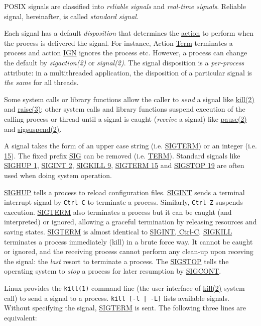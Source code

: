POSIX signals are classified into \textit{reliable signals} and
\textit{real-time signals}. Reliable signal, hereinafter, is
called \textit{standard signal}.

Each signal has a default \textit{disposition} that determines the
\uline{action} to perform when the process is delivered the
signal. For instance, Action \uline{Term} terminates a process and
action \uline{IGN} ignores the process etc. However, a process can
change the default by \textit{sigaction(2)} or
\textit{signal(2)}. The signal disposition is a
\textit{per-process} attribute: in a multithreaded application,
the disposition of a particular signal is \textit{the same} for
all threads.

Some system calls or library functions allow the caller to
\textit{send} a signal like \uline{kill(2)} and \uline{raise(3)};
other system calls and library functions suspend execution of the
calling process or thread until a signal is caught
(\textit{receive} a signal) like \uline{pause(2)} and
\uline{sigsuspend(2)}.

A signal takes the form of an upper case string
(i.e. \uline{SIGTERM}) or an integer (i.e. \uline{15}). The fixed
prefix \uline{SIG} can be removed (i.e. \uline{TERM}). Standard
signals like \uline{SIGHUP 1}, \uline{SIGINT 2}, \uline{SIGKILL
  9}, \uline{SIGTERM 15} and \uline{SIGSTOP 19} are often used
when doing system operation.

\uline{SIGHUP} tells a process to reload configuration
files. \uline{SIGINT} sends a terminal interrupt signal by
\verb|Ctrl-C| to terminate a process. Similarly, \verb|Ctrl-Z|
suspends execution. \uline{SIGTERM} also terminates a process but
it can be caught (and interpreted) or ignored, allowing a graceful
termination by releasing resources and saving
states. \uline{SIGTERM} is almost identical to \uline{SIGINT,
  Ctrl-C}. \uline{SIGKILL} terminates a process immediately (kill)
in a brute force way. It cannot be caught or ignored, and the
receiving process cannot perform any clean-up upon receving the
signal: the \textit{last} resort to terminate a process. The
\uline{SIGSTOP} tells the operating system to \textit{stop} a
process for later resumption by \uline{SIGCONT}.

Linux provides the \lstinline|kill(1)| command line (the user
interface of \uline{kill(2)} system call) to send a signal to a
process. \lstinline/kill [-l | -L]/ lists available
signals. Without specifying the signal, \uline{SIGTERM} is
sent. The following three lines are equivalent:

